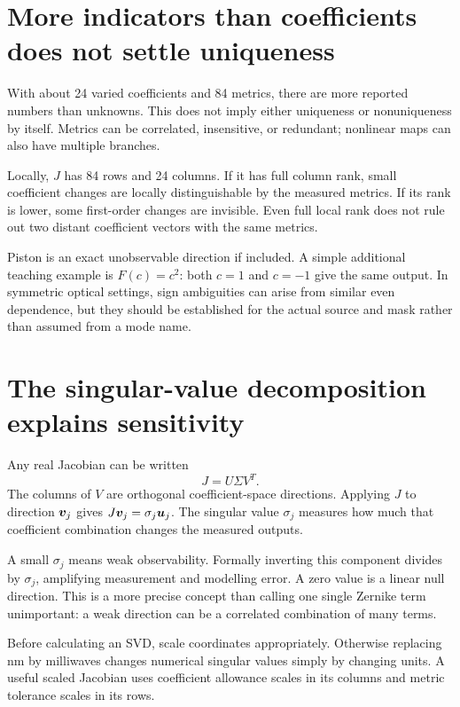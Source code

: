 \section{More indicators than coefficients does not settle uniqueness}
With about 24 varied coefficients and 84 metrics, there are more
reported numbers than unknowns. This does not imply either uniqueness
or nonuniqueness by itself. Metrics can be correlated, insensitive,
or redundant; nonlinear maps can also have multiple branches.

Locally, $J$ has 84 rows and 24 columns. If it has full column rank,
small coefficient changes are locally distinguishable by the measured
metrics. If its rank is lower, some first-order changes are invisible.
Even full local rank does not rule out two distant coefficient vectors
with the same metrics.

Piston is an exact unobservable direction if included. A simple
additional teaching example is $F(c)=c^2$: both $c=1$ and $c=-1$
give the same output. In symmetric optical settings, sign ambiguities
can arise from similar even dependence, but they should be established
for the actual source and mask rather than assumed from a mode name.

\section{The singular-value decomposition explains sensitivity}
Any real Jacobian can be written
\begin{equation}
J=U\Sigma V^T.
\label{eq:svd}
\end{equation}
The columns of $V$ are orthogonal coefficient-space directions.
Applying $J$ to direction $\bm{v}_j$ gives
$J\bm{v}_j=\sigma_j\bm{u}_j$.
The singular value $\sigma_j$ measures how much that coefficient
combination changes the measured outputs.

A small $\sigma_j$ means weak observability. Formally inverting this
component divides by $\sigma_j$, amplifying measurement and modelling
error. A zero value is a linear null direction.
This is a more precise concept than calling one single Zernike term
unimportant: a weak direction can be a correlated combination of many terms.

Before calculating an SVD, scale coordinates appropriately. Otherwise
replacing nm by milliwaves changes numerical singular values simply by
changing units. A useful scaled Jacobian uses coefficient allowance
scales in its columns and metric tolerance scales in its rows.

